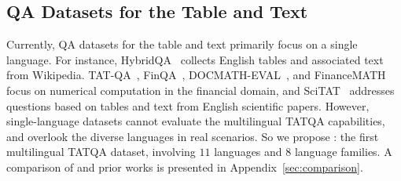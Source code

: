 \subsection{QA Datasets for the Table and Text}
Currently, QA datasets for the table and text primarily focus on a single language. 
For instance, HybridQA~\cite{chen-etal-2020-hybridqa} collects English tables and associated text from Wikipedia.
TAT-QA~\cite{zhu-etal-2021-tat}, FinQA~\cite{chen-etal-2021-finqa}, DOCMATH-EVAL~\cite{zhao-etal-2024-docmath}, and FinanceMATH~\cite{zhao-etal-2024-FinanceMATH} focus on numerical computation in the financial domain, and SciTAT~\cite{zhang2024scitat} addresses questions based on tables and text from English scientific papers. 
However, single-language datasets cannot evaluate the multilingual TATQA capabilities, and overlook the diverse languages in real scenarios. 
So we propose \ourdataset: the first multilingual TATQA dataset, involving $11$ languages and $8$ language families.
A comparison of \ourdataset and prior works is presented in Appendix~\ref{sec:comparison}.


